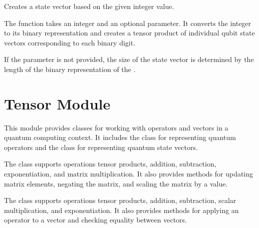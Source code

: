 \documentclass[letterpaper,10pt,english]{sphinxmanual}
\begin{document}
\begin{fulllineitems}
\label{\detokenize{index:utils.state_vector.makeStateVector}}
\pysigstartsignatures
{}
\pysigstopsignatures
\sphinxAtStartPar
Creates a state vector based on the given integer value.

\sphinxAtStartPar
The function takes an integer  and an optional  parameter. It converts
the integer to its binary representation and creates a tensor product of individual
qubit state vectors corresponding to each binary digit.

\sphinxAtStartPar
If the  parameter is not provided, the size of the state vector is determined
by the length of the binary representation of the .

\end{fulllineitems}


\chapter{Tensor Module}
\label{\detokenize{index:tensor-module}}\label{\detokenize{index:module-utils.tensor}}
\sphinxAtStartPar
This module provides classes for working with operators and vectors in a quantum computing context.
It includes the  class for representing quantum operators and the  class for
representing quantum state vectors.

\sphinxAtStartPar
The  class supports operations tensor products, addition, subtraction,
exponentiation, and matrix multiplication. It also provides methods for updating matrix elements,
negating the matrix, and scaling the matrix by a value.

\sphinxAtStartPar
The  class supports operations tensor products,  addition, subtraction,
scalar multiplication, and exponentiation. It also provides methods for applying an operator to a
vector and checking equality between vectors.
\end{document}
